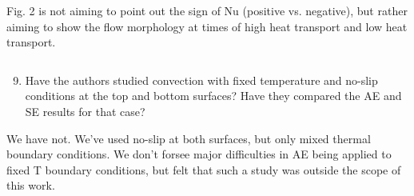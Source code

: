 \documentclass[aps, 11pt, singlecolumn]{revtex4-1} %
\begin{document}
\begin{singlespace}
Fig. 2 is not aiming to point out the sign of Nu (positive vs. negative), but
rather aiming to show the flow morphology at times of high heat transport and
low heat transport.

\begin{myquotation}
$\,$\\\vspace{-1.25cm}
\begin{enumerate}
\setcounter{enumi}{8}
\item Have the authors studied convection with fixed temperature and no-slip conditions at the top and bottom surfaces? Have they compared the AE and SE results for that case?
\end{enumerate}
\end{myquotation}
We have not. We've used no-slip at both surfaces, 
but only mixed thermal boundary conditions. 
We don't forsee major difficulties in AE being applied to fixed T boundary 
conditions, but felt that such a study was outside the scope of this work.





\end{singlespace}





\end{document}
